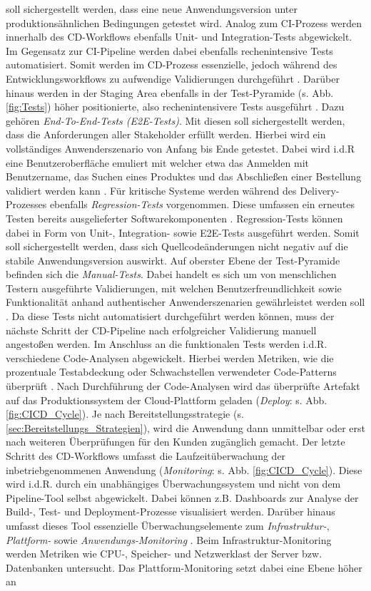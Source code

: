 soll sichergestellt werden, dass eine neue Anwendungsversion unter produktionsähnlichen Bedingungen getestet wird. Analog zum CI-Prozess werden innerhalb des CD-Workflows ebenfalls Unit- und Integration-Tests abgewickelt. Im Gegensatz zur CI-Pipeline werden dabei ebenfalls rechenintensive Tests automatisiert. Somit werden im CD-Prozess essenzielle, jedoch während des Entwicklungsworkflows zu aufwendige Validierungen durchgeführt \cite[20]{Halstenberg.2020}. Darüber hinaus werden in der Staging Area ebenfalls in der Test-Pyramide (s. Abb. \ref{fig:Tests}) höher positionierte, also rechenintensivere Tests ausgeführt \cite{Bose.20230220}. Dazu gehören \textit{End-To-End-Tests (\acs{E2E-Test}s)}. Mit diesen soll sichergestellt werden, dass die Anforderungen aller Stakeholder erfüllt werden. Hierbei wird ein vollständiges Anwenderszenario von Anfang bis Ende getestet. Dabei wird i.d.R eine Benutzeroberfläche emuliert mit welcher etwa das Anmelden mit Benutzername, das Suchen eines Produktes und das Abschließen einer Bestellung validiert werden kann \cite{Bose.20230220}. Für kritische Systeme werden während des Delivery-Prozesses ebenfalls \textit{Regression-Tests} vorgenommen. Diese umfassen ein erneutes Testen bereits ausgelieferter Softwarekomponenten \cite[S. 15 ff.]{Engstrom.2010}. Regression-Tests können dabei in Form von Unit-, Integration- sowie E2E-Tests ausgeführt werden. Somit soll sichergestellt werden, dass sich Quellcodeänderungen nicht negativ auf die stabile Anwendungsversion auswirkt. Auf oberster Ebene der Test-Pyramide befinden sich die \textit{Manual-Tests}. Dabei handelt es sich um von menschlichen Testern ausgeführte Validierungen, mit welchen Benutzerfreundlichkeit sowie Funktionalität anhand authentischer Anwenderszenarien gewährleistet werden soll \cite{Guru99.2020}. Da diese Tests nicht automatisiert durchgeführt werden können, muss der nächste Schritt der CD-Pipeline nach erfolgreicher Validierung manuell angestoßen werden. Im Anschluss an die funktionalen Tests werden i.d.R. verschiedene Code-Analysen abgewickelt. Hierbei werden Metriken, wie die prozentuale Testabdeckung oder Schwachstellen verwendeter Code-Patterns überprüft \cite[146]{Rangnau.10520201082020}. Nach Durchführung der Code-Analysen wird das überprüfte Artefakt auf das Produktionssystem der Cloud-Plattform geladen (\textit{Deploy}: s. Abb. \ref{fig:CICD_Cycle}). Je nach Bereitstellungsstrategie (s. \ref{sec:Bereitstellungs_Strategien}), wird die Anwendung dann unmittelbar oder erst nach weiteren Überprüfungen für den Kunden zugänglich gemacht. Der letzte Schritt des CD-Workflows umfasst die Laufzeitüberwachung der inbetriebgenommenen Anwendung (\textit{Monitoring}: s. Abb. \ref{fig:CICD_Cycle}). Diese wird i.d.R. durch ein unabhängiges Überwachungssystem und nicht von dem Pipeline-Tool selbst abgewickelt. Dabei können z.B. Dashboards zur Analyse der Build-, Test- und Deployment-Prozesse visualisiert werden. Darüber hinaus umfasst dieses Tool essenzielle Überwachungs\-elemente zum \textit{Infrastruktur-}, \textit{Plattform-} sowie \textit{Anwendungs-Monitoring} \cite{VMware.2022}\cite{Datadog.2021}\cite{.2023}. Beim Infra\-struktur-Monitoring werden Metriken wie CPU-, Speicher- und Netzwerklast der Server bzw. Datenbanken untersucht. Das Plattform-Monitoring setzt dabei eine Ebene höher an 